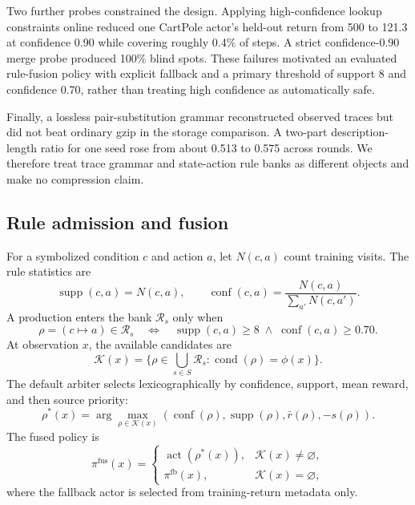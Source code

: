 \documentclass[11pt,a4paper]{article}
\newcommand{\R}{\mathcal{R}}
\newcommand{\K}{\mathcal{K}}
\begin{document}
Two further probes constrained the design. Applying high-confidence lookup constraints online reduced one CartPole actor's held-out return from 500 to 121.3 at confidence 0.90 while covering roughly 0.4\% of steps. A strict confidence-0.90 merge probe produced 100\% blind spots. These failures motivated an evaluated rule-fusion policy with explicit fallback and a primary threshold of support 8 and confidence 0.70, rather than treating high confidence as automatically safe.

Finally, a lossless pair-substitution grammar reconstructed observed traces but did not beat ordinary gzip in the storage comparison. A two-part description-length ratio for one seed rose from about 0.513 to 0.575 across rounds. We therefore treat trace grammar and state-action rule banks as different objects and make no compression claim.

\subsection{Rule admission and fusion}
For a symbolized condition $c$ and action $a$, let $N(c,a)$ count training visits. The rule statistics are
\begin{equation}
\operatorname{supp}(c,a)=N(c,a),\qquad
\operatorname{conf}(c,a)=\frac{N(c,a)}{\sum_{a'}N(c,a')}.
\label{eq:statistics}
\end{equation}
A production enters the bank $\R_s$ only when
\begin{equation}
\rho=(c\mapsto a)\in\R_s
\quad\Longleftrightarrow\quad
\operatorname{supp}(c,a)\geq 8\;\wedge\;
\operatorname{conf}(c,a)\geq 0.70.
\label{eq:admission}
\end{equation}
At observation $x$, the available candidates are
\begin{equation}
\K(x)=\{\rho\in\bigcup_{s\in S}\R_s:\operatorname{cond}(\rho)=\phi(x)\}.
\label{eq:candidates}
\end{equation}
The default arbiter selects lexicographically by confidence, support, mean reward, and then source priority:
\begin{equation}
\rho^*(x)=\arg\max_{\rho\in\K(x)}
  (\operatorname{conf}(\rho),\operatorname{supp}(\rho),\bar r(\rho),-s(\rho)).
\label{eq:arbiter}
\end{equation}
The fused policy is
\begin{equation}
\pi^{\mathrm{fus}}(x)=
\begin{cases}
\operatorname{act}(\rho^*(x)),&\K(x)\neq\varnothing,\\
\pi^{\mathrm{fb}}(x),&\K(x)=\varnothing,
\end{cases}
\label{eq:fusion}
\end{equation}
where the fallback actor is selected from training-return metadata only.
\end{document}

